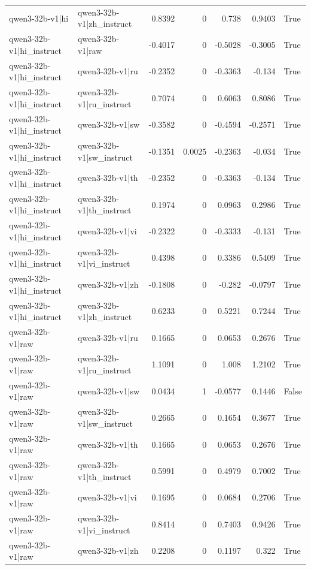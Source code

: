\begin{table}
\begin{tabular}{l l r r r r l}
qwen3-32b-v1|hi & qwen3-32b-v1|zh_instruct & 0.8392 & 0 & 0.738 & 0.9403 & True \\
qwen3-32b-v1|hi_instruct & qwen3-32b-v1|raw & -0.4017 & 0 & -0.5028 & -0.3005 & True \\
qwen3-32b-v1|hi_instruct & qwen3-32b-v1|ru & -0.2352 & 0 & -0.3363 & -0.134 & True \\
qwen3-32b-v1|hi_instruct & qwen3-32b-v1|ru_instruct & 0.7074 & 0 & 0.6063 & 0.8086 & True \\
qwen3-32b-v1|hi_instruct & qwen3-32b-v1|sw & -0.3582 & 0 & -0.4594 & -0.2571 & True \\
qwen3-32b-v1|hi_instruct & qwen3-32b-v1|sw_instruct & -0.1351 & 0.0025 & -0.2363 & -0.034 & True \\
qwen3-32b-v1|hi_instruct & qwen3-32b-v1|th & -0.2352 & 0 & -0.3363 & -0.134 & True \\
qwen3-32b-v1|hi_instruct & qwen3-32b-v1|th_instruct & 0.1974 & 0 & 0.0963 & 0.2986 & True \\
qwen3-32b-v1|hi_instruct & qwen3-32b-v1|vi & -0.2322 & 0 & -0.3333 & -0.131 & True \\
qwen3-32b-v1|hi_instruct & qwen3-32b-v1|vi_instruct & 0.4398 & 0 & 0.3386 & 0.5409 & True \\
qwen3-32b-v1|hi_instruct & qwen3-32b-v1|zh & -0.1808 & 0 & -0.282 & -0.0797 & True \\
qwen3-32b-v1|hi_instruct & qwen3-32b-v1|zh_instruct & 0.6233 & 0 & 0.5221 & 0.7244 & True \\
qwen3-32b-v1|raw & qwen3-32b-v1|ru & 0.1665 & 0 & 0.0653 & 0.2676 & True \\
qwen3-32b-v1|raw & qwen3-32b-v1|ru_instruct & 1.1091 & 0 & 1.008 & 1.2102 & True \\
qwen3-32b-v1|raw & qwen3-32b-v1|sw & 0.0434 & 1 & -0.0577 & 0.1446 & False \\
qwen3-32b-v1|raw & qwen3-32b-v1|sw_instruct & 0.2665 & 0 & 0.1654 & 0.3677 & True \\
qwen3-32b-v1|raw & qwen3-32b-v1|th & 0.1665 & 0 & 0.0653 & 0.2676 & True \\
qwen3-32b-v1|raw & qwen3-32b-v1|th_instruct & 0.5991 & 0 & 0.4979 & 0.7002 & True \\
qwen3-32b-v1|raw & qwen3-32b-v1|vi & 0.1695 & 0 & 0.0684 & 0.2706 & True \\
qwen3-32b-v1|raw & qwen3-32b-v1|vi_instruct & 0.8414 & 0 & 0.7403 & 0.9426 & True \\
qwen3-32b-v1|raw & qwen3-32b-v1|zh & 0.2208 & 0 & 0.1197 & 0.322 & True \\

\end{tabular}
\end{table}
